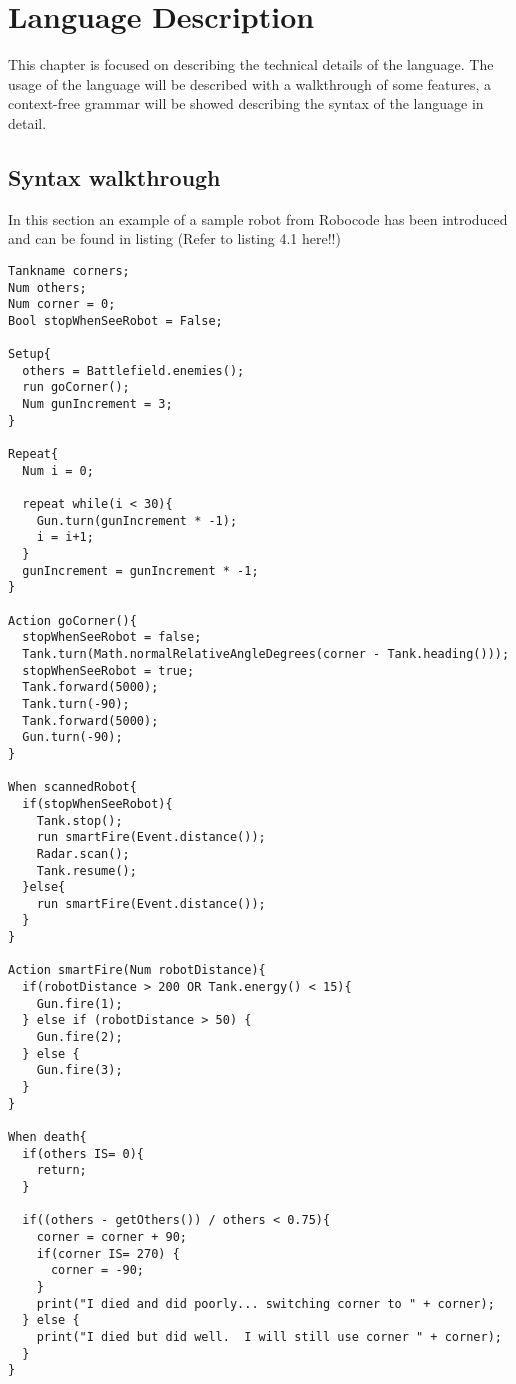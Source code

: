 \chapter{Language Description}
\label{chap:LanguageDescription}
This chapter is focused on describing the technical details of the language. The usage of the language will be described with a walkthrough of some features, a context-free grammar will be showed describing the syntax of the language in detail. 

\section{Syntax walkthrough}
In this section an example of a sample robot from Robocode has been introduced and can be found in listing (Refer to listing 4.1 here!!)

\begin{lstlisting}[caption={Eksampel of the sample robot "Corners" in our language} label=corners]
Tankname corners;
Num others;
Num corner = 0;
Bool stopWhenSeeRobot = False;

Setup{
  others = Battlefield.enemies();  
  run goCorner();	 
  Num gunIncrement = 3;
}

Repeat{  
  Num i = 0;
  
  repeat while(i < 30){
    Gun.turn(gunIncrement * -1);
    i = i+1;
  }  
  gunIncrement = gunIncrement * -1;
}

Action goCorner(){
  stopWhenSeeRobot = false;  
  Tank.turn(Math.normalRelativeAngleDegrees(corner - Tank.heading()));      
  stopWhenSeeRobot = true;
  Tank.forward(5000);
  Tank.turn(-90);
  Tank.forward(5000);
  Gun.turn(-90);
}

When scannedRobot{
  if(stopWhenSeeRobot){
    Tank.stop();                                     
    run smartFire(Event.distance());
    Radar.scan();                                     
    Tank.resume();                                   
  }else{
    run smartFire(Event.distance());
  }
}

Action smartFire(Num robotDistance){
  if(robotDistance > 200 OR Tank.energy() < 15){
    Gun.fire(1);
  } else if (robotDistance > 50) {
    Gun.fire(2);
  } else {
    Gun.fire(3);
  }
}

When death{
  if(others IS= 0){
    return;
  }
  
  if((others - getOthers()) / others < 0.75){
    corner = corner + 90;
    if(corner IS= 270) {
      corner = -90;
    }
    print("I died and did poorly... switching corner to " + corner);
  } else {
    print("I died but did well.  I will still use corner " + corner);
  }
}
\end{lstlisting}

